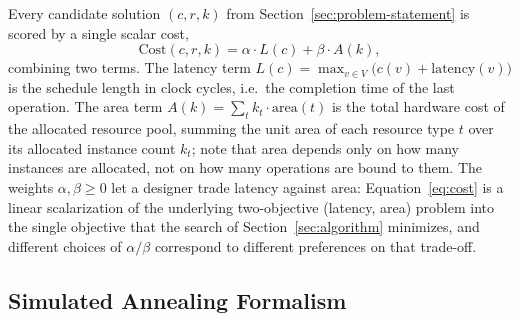 \documentclass[conference]{IEEEtran}
\begin{document}
    Every candidate solution $(c, r, k)$ from Section~\ref{sec:problem-statement} is scored by a
    single scalar cost,
    \begin{equation}
        \text{Cost}(c, r, k) = \alpha \cdot L(c) + \beta \cdot A(k),
        \label{eq:cost}
    \end{equation}
    combining two terms. The latency term $L(c) = \max_{v \in V} \big(c(v) + \mathrm{latency}(v)\big)$
    is the schedule length in clock cycles, i.e.\ the completion time of the last operation. The area
    term $A(k) = \sum_{t} k_t \cdot \mathrm{area}(t)$ is the total hardware cost of the allocated
    resource pool, summing the unit area of each resource type $t$ over its allocated instance count
    $k_t$; note that area depends only on how many instances are allocated, not on how many operations
    are bound to them. The weights $\alpha, \beta \geq 0$ let a designer trade latency against area:
    Equation~\eqref{eq:cost} is a linear scalarization of the underlying two-objective
    (latency, area) problem into the single objective that the search of Section~\ref{sec:algorithm}
    minimizes, and different choices of $\alpha/\beta$ correspond to different preferences on that
    trade-off.

    \subsection{Simulated Annealing Formalism}
    \label{sec:sa-formalism}
\end{document}
